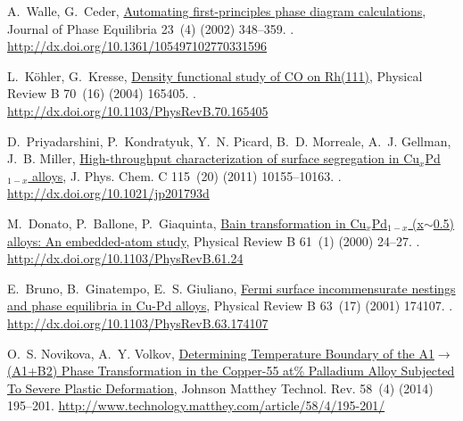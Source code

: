 \documentclass[number, sort&compress, review, 12pt]{elsarticle}
\begin{document}
\begin{thebibliography}{10}
A.~Walle, G.~Ceder,
  \href{http://dx.doi.org/10.1361/105497102770331596}{Automating
  first-principles phase diagram calculations}, Journal of Phase Equilibria
  23~(4) (2002) 348--359.
\newblock \href {http://dx.doi.org/10.1361/105497102770331596}
  {}.
\newline\urlprefix\url{http://dx.doi.org/10.1361/105497102770331596}

L.~K\"{o}hler, G.~Kresse,
  \href{http://dx.doi.org/10.1103/PhysRevB.70.165405}{Density functional study
  of {CO} on {Rh}(111)}, Physical Review B 70~(16) (2004) 165405.
\newblock \href {http://dx.doi.org/10.1103/physrevb.70.165405}
  {}.
\newline\urlprefix\url{http://dx.doi.org/10.1103/PhysRevB.70.165405}

D.~Priyadarshini, P.~Kondratyuk, Y.~N. Picard, B.~D. Morreale, A.~J. Gellman,
  J.~B. Miller, \href{http://dx.doi.org/10.1021/jp201793d}{High-throughput
  characterization of surface segregation in {Cu}$_{x}${Pd}$_{1-x}$ alloys}, J.
  Phys. Chem. C 115~(20) (2011) 10155--10163.
\newblock \href {http://dx.doi.org/10.1021/jp201793d}
  {}.
\newline\urlprefix\url{http://dx.doi.org/10.1021/jp201793d}

M.~Donato, P.~Ballone, P.~Giaquinta,
  \href{http://dx.doi.org/10.1103/PhysRevB.61.24}{Bain transformation in
  {Cu}$_{x}${Pd}$_{1-x}$ (x$\sim$0.5) alloys: An embedded-atom study}, Physical
  Review B 61~(1) (2000) 24--27.
\newblock \href {http://dx.doi.org/10.1103/physrevb.61.24}
  {}.
\newline\urlprefix\url{http://dx.doi.org/10.1103/PhysRevB.61.24}

E.~Bruno, B.~Ginatempo, E.~S. Giuliano,
  \href{http://dx.doi.org/10.1103/PhysRevB.63.174107}{Fermi surface
  incommensurate nestings and phase equilibria in {Cu-Pd} alloys}, Physical
  Review B 63~(17) (2001) 174107.
\newblock \href {http://dx.doi.org/10.1103/physrevb.63.174107}
  {}.
\newline\urlprefix\url{http://dx.doi.org/10.1103/PhysRevB.63.174107}

O.~S. Novikova, A.~Y. Volkov,
  \href{http://www.technology.matthey.com/article/58/4/195-201/}{{Determining
  Temperature Boundary of the A1$\rightarrow$(A1+B2) Phase Transformation in
  the Copper-55 at\% Palladium Alloy Subjected To Severe Plastic Deformation}},
  Johnson Matthey Technol. Rev. 58~(4) (2014) 195--201.
\newline\urlprefix\url{http://www.technology.matthey.com/article/58/4/195-201/}


\end{thebibliography}
\end{document}
